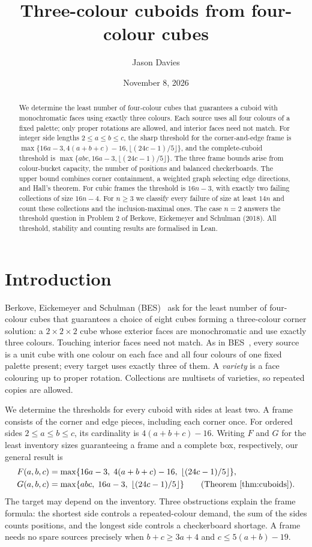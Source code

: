 \documentclass[11pt]{article}
\title{Three-colour cuboids from four-colour cubes}
\author{Jason Davies}
\date{November 8, 2026}
\theoremstyle{remark}
\begin{document}
\maketitle

\begin{abstract}
We determine the least number of four-colour cubes that guarantees a cuboid
with monochromatic faces using exactly three colours. Each source uses all
four colours of a fixed palette; only proper rotations are allowed, and
interior faces need not match. For integer side lengths $2\le a\le b\le c$,
the sharp threshold for the corner-and-edge frame is
$\max\{16a-3,4(a+b+c)-16,\lfloor(24c-1)/5\rfloor\}$, and the complete-cuboid
threshold is $\max\{abc,16a-3,\lfloor(24c-1)/5\rfloor\}$.
The three frame bounds arise from colour-bucket capacity, the number of
positions and balanced checkerboards. The upper bound combines corner
containment, a weighted graph selecting edge directions, and Hall's theorem.
For cubic frames the threshold is $16n-3$, with exactly two failing
collections of size $16n-4$. For $n\ge3$ we classify every failure of size
at least $14n$ and count these collections and the inclusion-maximal ones.
The case $n=2$ answers the threshold question in Problem 2 of Berkove,
Eickemeyer and Schulman (2018).
All threshold, stability and counting results are formalised in Lean.
\end{abstract}

\section{Introduction}
Berkove, Eickemeyer and Schulman (BES)~\cite[Problem 2]{BES} ask for the
least number of four-colour cubes that guarantees a choice of eight cubes
forming a three-colour corner solution: a $2\times2\times2$ cube whose
exterior faces are monochromatic and use exactly three colours. Touching
interior faces need not match.
As in BES~\cite[Section 1]{BES}, every source is a unit cube with one colour
on each face and all four colours of one fixed palette present; every
target uses exactly three of them. A
\emph{variety} is a face colouring up to proper rotation.
Collections are multisets of varieties, so repeated copies
are allowed.

We determine the thresholds for every cuboid with sides at least two.
A frame consists of the corner and edge pieces, including each corner once.
For ordered sides $2\le a\le b\le c$, its cardinality is $4(a+b+c)-16$.
Writing $F$ and $G$ for the least inventory sizes guaranteeing a frame and
a complete box, respectively, our general result is
\begin{align*}
 F(a,b,c)&=\max\{16a-3,\;4(a+b+c)-16,\;\lfloor(24c-1)/5\rfloor\},\\
 G(a,b,c)&=\max\{abc,\;16a-3,\;\lfloor(24c-1)/5\rfloor\}
 \qquad\text{(Theorem~\ref{thm:cuboids}).}
\end{align*}
The target may depend on the inventory. Three obstructions explain the
frame formula: the shortest side controls a repeated-colour demand,
the sum of the sides counts positions, and the longest side controls a
checkerboard shortage. A frame needs no spare sources precisely when
$b+c\ge3a+4$ and $c\le5(a+b)-19$.
\end{document}

